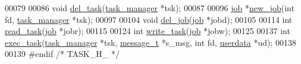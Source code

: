 \begin{DoxyCode}
00079 
00086 \textcolor{keywordtype}{void} \mbox{\hyperlink{task_8h_aeffb5dad0f2438558b4eabfe643cb450}{del\_task}}(\mbox{\hyperlink{struct__task__manager}{task\_manager}} *tsk);
00087 
00096 \mbox{\hyperlink{struct__job}{job}} *\mbox{\hyperlink{task_8h_a266921ef0e6577e64d1a610c6a5a4059}{new\_job}}(\textcolor{keywordtype}{int} fd, \mbox{\hyperlink{struct__task__manager}{task\_manager}} *tsk);
00097 
00104 \textcolor{keywordtype}{void} \mbox{\hyperlink{task_8h_a0cd9a89e1c14740d1519dc186636b5bc}{del\_job}}(\mbox{\hyperlink{struct__job}{job}} *jobd);
00105 
00114 \textcolor{keywordtype}{int} \mbox{\hyperlink{task_8h_a7eb471712750e50636ea6647d8b08125}{read\_task}}(\mbox{\hyperlink{struct__job}{job}} *jobr);
00115 
00124 \textcolor{keywordtype}{int} \mbox{\hyperlink{task_8h_a03632619b1f9d2ad6d4fee583f504233}{write\_task}}(\mbox{\hyperlink{struct__job}{job}} *jobw);
00125 
00137 \textcolor{keywordtype}{int} \mbox{\hyperlink{task_8h_af25be8d82c44505f8d002e18925cfae8}{exec\_task}}(\mbox{\hyperlink{struct__task__manager}{task\_manager}} *tsk, \mbox{\hyperlink{structmessage__t}{message\_t}} *s\_msg, \textcolor{keywordtype}{int} fd, 
      \mbox{\hyperlink{struct__usersdata}{userdata}} *ud);
00138 
00139 \textcolor{preprocessor}{#endif }\textcolor{comment}{/* TASK\_H\_ */}\textcolor{preprocessor}{}
\end{DoxyCode}

